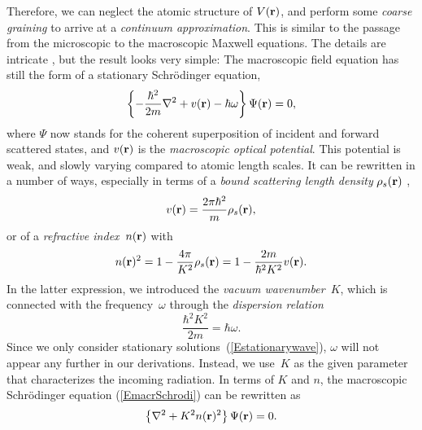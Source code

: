 Therefore,
we can neglect the atomic structure of $V(\mathbf{r})$,
and perform some \textit{coarse graining} to
arrive at a \textit{continuum approximation}.%
This is 
similar to the passage from
the microscopic to the macroscopic Maxwell equations.
The details are intricate \cite{Sea89,Lax51},
but the result \cite[eq.~2.8.32]{Sea89} looks very simple:
The macroscopic field equation
has still the form of a stationary Schrödinger equation,
\begin{equation}\label{EmacrSchrodi}
  \left\{-\frac{\hbar^2}{2m}\mathbf{\nabla}^2+v(\mathbf{r})-\hbar\omega\right\} \Psi(\mathbf{r}) = 0,
\end{equation}
where $\Psi$ now stands for the coherent superposition of
incident and forward scattered states,
and $v(\mathbf{r})$ is the \textit{macroscopic optical potential}.%
This potential is weak, and slowly varying compared to atomic length scales.
It can be rewritten in a number of ways,
especially in terms of a
\textit{bound scattering length density}%
$\rho_s(\mathbf{r})$ \cite[eq.\ 2.8.37]{Sea89},
\begin{equation}
  v(\mathbf{r})=\frac{2\pi \hbar^2}{m}\rho_s(\mathbf{r}),  
\end{equation}
or of a \textit{refractive index}~$n(\mathbf{r})$%
with
\begin{equation}\label{EnRefrIndx}
  n(\mathbf{r})^2=1-\frac{4\pi}{K^2}\rho_s(\mathbf{r}) = 1 -\frac{2m}{\hbar^2 K^2}v(\mathbf{r}).
\end{equation}
In the latter expression,
we introduced the \textit{vacuum wavenumber}~$K$,
which is connected with the frequency~$\omega$ through the
\textit{dispersion relation}
\begin{equation}
  \frac{\hbar^2 K^2}{2m} = \hbar\omega.
\end{equation}
Since we only consider stationary solutions~(\ref{Estationarywave}),
$\omega$ will not appear any further in our derivations.
Instead, we use~$K$ as the given parameter that characterizes the
incoming radiation.
In terms of $K$ and $n$,
the macroscopic Schrödinger equation (\ref{EmacrSchrodi})
can be rewritten as
\begin{equation}\label{EnSchrodi}
  \left\{\mathbf{\nabla}^2+K^2n(\mathbf{r})^2\right\}\Psi(\mathbf{r}) = 0.
\end{equation}

